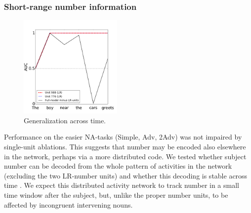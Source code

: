 \subsubsection{Short-range number information}
\begin{figure}[h]
    \centering
    \includegraphics[height=5cm]{Figures/GAT1d_cell_nounpp_SR_LR_single_unit.png}
    \caption{Generalization across time.}
    \label{fig:GAT}
\end{figure}

Performance on the easier NA-tasks (Simple, Adv, 2Adv) was not
impaired by single-unit ablations. This suggests that number may be
encoded also elsewhere in the network, perhaps via a more distributed
code. We tested whether subject number can be decoded from the whole
pattern of activities in the network (excluding the two LR-number units)
and whether this decoding is stable across time \cite[see][for similar
observations and related methods]{Giulianelli:etal:2018}. We expect
this distributed activity network to track number in a
small time window after the subject, but, unlike the proper number units,
to be affected by incongruent intervening nouns.

